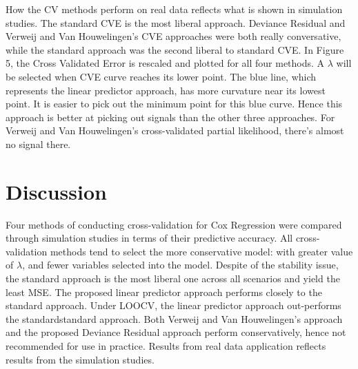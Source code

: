 \par How the CV methods perform on real data reflects what is shown in simulation studies. The standard CVE is the most liberal approach. Deviance Residual and Verweij and Van Houwelingen's CVE approaches were both really conversative, while the standard approach was the second liberal to standard CVE. In Figure 5, the Cross Validated Error is rescaled and plotted for all four methods. A $\lambda$ will be selected when CVE curve reaches its lower point. The blue line, which represents the linear predictor approach, has more curvature near its lowest point. It is easier to pick out the minimum point for this blue curve. Hence this approach is better at picking out signals than the other three approaches. For Verweij and Van Houwelingen's cross-validated partial likelihood, there's almost no signal there.

\section{Discussion}
Four methods of conducting cross-validation for Cox Regression were compared through simulation studies in terms of their predictive accuracy. All cross-validation methods tend to select the more conservative model: with greater value of $\lambda$, and fewer variables selected into the model. Despite of the stability issue, the standard approach is the most liberal one across all scenarios and yield the least MSE. The proposed linear predictor approach performs closely to the standard approach. Under LOOCV, the linear predictor approach out-performs the standardstandard approach. Both Verweij and Van Houwelingen's approach and the proposed Deviance Residual approach perform conservatively, hence not recommended for use in practice. Results from real data application reflects results from the simulation studies.
